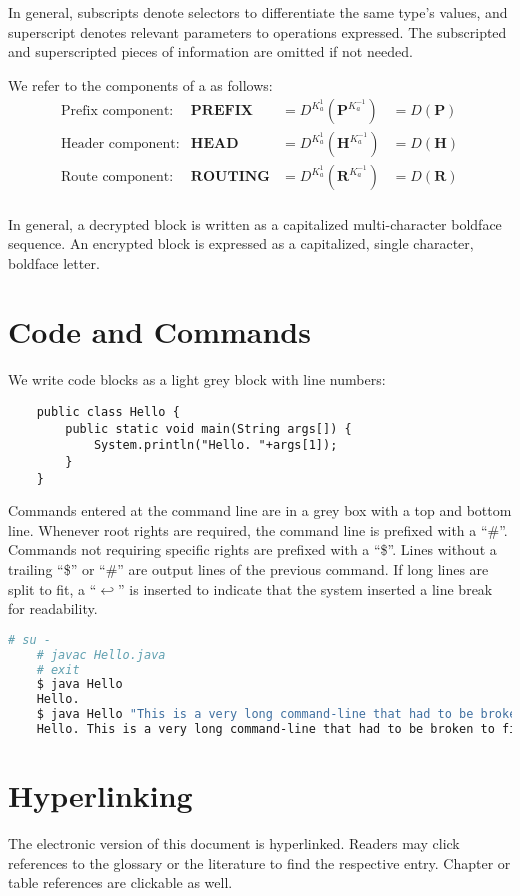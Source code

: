 In general, subscripts denote selectors to differentiate the same type's values, and superscript denotes relevant parameters to operations expressed. The subscripted and superscripted pieces of information are omitted if not needed.

We refer to the components of a \VortexMessage{} as follows:
\begin{align*}
	\text{Prefix component:}         & \mathbf{PREFIX}                 &=D^{K^{1}_a}\left(\mathbf{P}^{K^{-1}_a}\right) &=D\left(\mathbf{P}\right)\\
	\text{Header component:}         & \mathbf{HEAD}                   &=D^{K^{1}_a}\left(\mathbf{H}^{K^{-1}_a}\right) &=D\left(\mathbf{H}\right)\\
	\text{Route component:}         & \mathbf{ROUTING}                 &=D^{K^{1}_a}\left(\mathbf{R}^{K^{-1}_a}\right) &=D\left(\mathbf{R}\right)\\
\end{align*}

In general, a decrypted block is written as a capitalized multi-character boldface sequence. An encrypted block is expressed as a capitalized, single character, boldface letter.

\section{Code and Commands}
We write code blocks as a light grey block with line numbers:

\begin{lstlisting}
	public class Hello {
		public static void main(String args[]) {
			System.println("Hello. "+args[1]);
		}
	}
\end{lstlisting}

Commands entered at the command line are in a grey box with a top and bottom line. Whenever root rights are required, the command line is prefixed with a ``\#''. Commands not requiring specific rights are prefixed with a ``\$''. Lines without a trailing ``\$'' or ``\#'' are output lines of the previous command. If long lines are split to fit, a ``$\hookleftarrow$'' is inserted to indicate that the system inserted a line break for readability.

\begin{lstlisting}[language=bash]
	# su -
	# javac Hello.java 
	# exit
	$ java Hello
	Hello.
	$ java Hello "This is a very long command-line that had to be broken to fit into the code box displayed on this page."
	Hello. This is a very long command-line that had to be broken to fit into the code box displayed on this page.
\end{lstlisting}

\section{Hyperlinking}
The electronic version of this document is hyperlinked. Readers may click references to the glossary or the literature to find the respective entry. Chapter or table references are clickable as well. 


